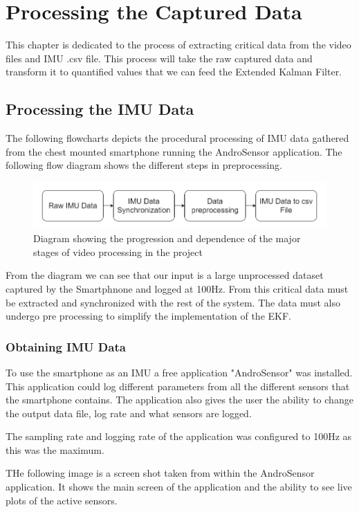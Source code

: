 \chapter{Processing the Captured Data}
This chapter is dedicated to the process of extracting critical data from the video files and IMU .csv file. This process will take the raw captured data and transform it to quantified values that we can feed the Extended Kalman Filter.

\section{Processing the IMU Data}
The following flowcharts depicts the procedural processing of IMU data gathered from the chest mounted smartphone running the AndroSensor application. The following flow diagram shows the different steps in preprocessing.

\begin{figure}[!ht]
\includegraphics[width=\linewidth]{figures/imuflow.png}
\caption{Diagram showing the progression and dependence of the major stages of video processing in the project}
\label{fig:imuflow}
\end{figure}

From the diagram we can see that our input is a large unprocessed dataset captured by the Smartphnone and logged at 100Hz. From this critical data must be extracted and synchronized with the rest of the system. The data must also undergo pre processing to simplify the implementation of the EKF. 

\subsection{Obtaining IMU Data}
To use the smartphone as an IMU a free application "AndroSensor" \cite{androsensor} was installed. This application could log different parameters from all the different sensors that the smartphone contains. The application also gives the user the ability to change the output data file, log rate and what sensors are logged.

The sampling rate and logging rate of the application was configured to 100Hz as this was the maximum.

THe following image is a screen shot taken from within the AndroSensor application. It shows the main screen of the application and the ability to see live plots of the active sensors.

